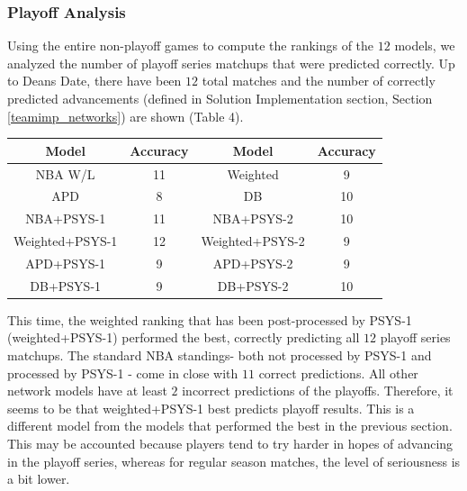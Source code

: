 \documentclass[12pt]{article}%
\begin{document}
\subsubsection{Playoff Analysis}
\null\quad\quad Using the entire non-playoff games to compute the rankings of the $12$ models, we analyzed the number of playoff series matchups that were predicted correctly. Up to Deans Date, there have been $12$ total matches and the number of correctly predicted advancements (defined in Solution Implementation section, Section \ref{teamimp_networks}) are shown (Table 4).
\begin{center}
\begin{tabular}{|c c|c c|}
\hline
\textbf{Model} & \textbf{Accuracy} & \textbf{Model} & \textbf{Accuracy}\\\hline
NBA W/L&11&Weighted&9\\\hline
APD&8&DB&10\\\hline
NBA+PSYS-1&11&NBA+PSYS-2&10\\\hline
Weighted+PSYS-1&12&Weighted+PSYS-2&9\\\hline
APD+PSYS-1&9&APD+PSYS-2&9\\\hline
DB+PSYS-1&9&DB+PSYS-2&10\\\hline
\end{tabular}
\end{center}
This time, the weighted ranking that has been post-processed by PSYS-1 (weighted+PSYS-1) performed the best, correctly predicting all $12$ playoff series matchups. The standard NBA standings- both not processed by PSYS-1 and processed by PSYS-1 - come in close with $11$ correct predictions. All other network models have at least $2$ incorrect predictions of the playoffs. Therefore, it seems to be that weighted+PSYS-1 best predicts playoff results. This is a different model from the models that performed the best in the previous section. This may be accounted because players tend to try harder in hopes of advancing in the playoff series, whereas for regular season matches, the level of seriousness is a bit lower.
\end{document}
